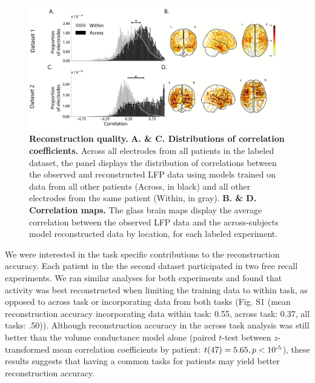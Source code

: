 \documentclass[12pt]{article}
\begin{document}
\begin{figure}
  \centering
  \includegraphics[width=\textwidth]{figs/corrmap}
  \caption{\textbf{Reconstruction quality.}  \textbf{A. \& C.  Distributions
      of correlation coefficients.}  Across all electrodes from all
    patients in the labeled dataset, the panel displays the distribution of correlations between the observed and reconstructed LFP data using models trained on data from all other patients (Across, in black) and all other electrodes from the same patient (Within, in gray). 
    \textbf{B. \& D. Correlation maps.}  The glass brain maps display the
    average correlation between the observed LFP data and the across-subjects model reconstructed data by location, for each labeled experiment.}
  \label{fig:corrmap}
\end{figure}

We were interested in the task specific contributions to the reconstruction accuracy.  Each patient in the the second dataset participated in two free recall experiments.  We ran similar analyses for both experiments and found that activity was best reconstructed when limiting the training data to within task, as opposed to across task or incorporating data from both tasks (Fig. S1 (mean reconstruction accuracy incorporating data within task: 0.55, across task: 0.37, all tasks: .50)). Although reconstruction accuracy in the across task analysis was still better than the volume conductance model alone (paired $t$-test
between $z$-transformed mean correlation coefficients by patient: $t(47) = 5.65, p < 10\textsuperscript{-5}$), these results suggests that having a common tasks for patients may yield better reconstruction accuracy.  
\end{document}
